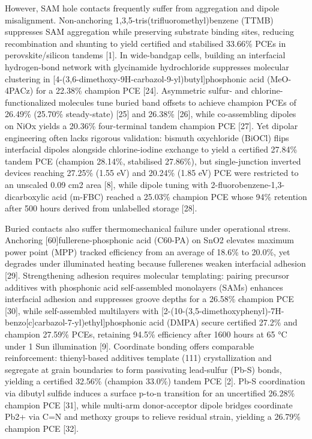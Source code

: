 \documentclass[
  11pt,
]{article}
\begin{document}
However, SAM hole contacts frequently suffer from aggregation and dipole
misalignment. Non-anchoring 1,3,5-tris(trifluoromethyl)benzene (TTMB)
suppresses SAM aggregation while preserving substrate binding sites,
reducing recombination and shunting to yield certified and stabilised
33.66\% PCEs in perovskite/silicon tandems {[}1{]}. In wide-bandgap
cells, building an interfacial hydrogen-bond network with glycinamide
hydrochloride suppresses molecular clustering in
{[}4-(3,6-dimethoxy-9H-carbazol-9-yl)butyl{]}phosphonic acid (MeO-4PACz)
for a 22.38\% champion PCE {[}24{]}. Asymmetric sulfur- and
chlorine-functionalized molecules tune buried band offsets to achieve
champion PCEs of 26.49\% (25.70\% steady-state) {[}25{]} and 26.38\%
{[}26{]}, while co-assembling dipoles on NiOx yields a 20.36\%
four-terminal tandem champion PCE {[}27{]}. Yet dipolar engineering
often lacks rigorous validation: bismuth oxychloride (BiOCl) flips
interfacial dipoles alongside chlorine-iodine exchange to yield a
certified 27.84\% tandem PCE (champion 28.14\%, stabilised 27.86\%), but
single-junction inverted devices reaching 27.25\% (1.55 eV) and 20.24\%
(1.85 eV) PCE were restricted to an unscaled 0.09 cm2 area {[}8{]},
while dipole tuning with 2-fluorobenzene-1,3-dicarboxylic acid (m-FBC)
reached a 25.03\% champion PCE whose 94\% retention after 500 hours
derived from unlabelled storage {[}28{]}.

Buried contacts also suffer thermomechanical failure under operational
stress. Anchoring {[}60{]}fullerene-phosphonic acid (C60-PA) on SnO2
elevates maximum power point (MPP) tracked efficiency from an average of
18.6\% to 20.0\%, yet degrades under illuminated heating because
fullerenes weaken interfacial adhesion {[}29{]}. Strengthening adhesion
requires molecular templating: pairing precursor additives with
phosphonic acid self-assembled monolayers (SAMs) enhances interfacial
adhesion and suppresses groove depths for a 26.58\% champion PCE
{[}30{]}, while self-assembled multilayers with
{[}2-(10-(3,5-dimethoxyphenyl)-7H-benzo{[}c{]}carbazol-7-yl)ethyl{]}phosphonic
acid (DMPA) secure certified 27.2\% and champion 27.59\% PCEs, retaining
94.5\% efficiency after 1600 hours at 65 °C under 1 Sun illumination
{[}9{]}. Coordinate bonding offers comparable reinforcement:
thienyl-based additives template (111) crystallization and segregate at
grain boundaries to form passivating lead-sulfur (Pb-S) bonds, yielding
a certified 32.56\% (champion 33.0\%) tandem PCE {[}2{]}. Pb-S
coordination via dibutyl sulfide induces a surface p-to-n transition for
an uncertified 26.28\% champion PCE {[}31{]}, while multi-arm
donor-acceptor dipole bridges coordinate Pb2+ via C=N and methoxy groups
to relieve residual strain, yielding a 26.79\% champion PCE {[}32{]}.
\end{document}
